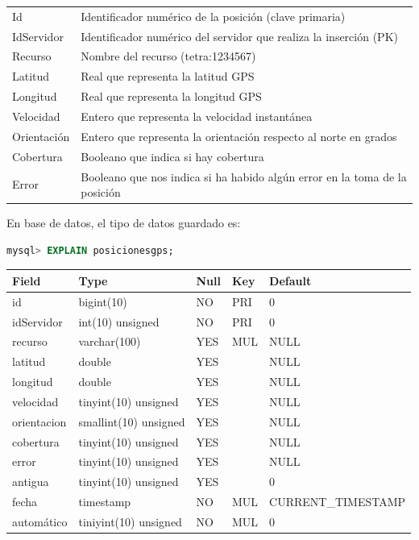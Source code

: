\documentclass[a4paper, 12pt]{article}
\begin{document}
\begin{center}
	\begin{tabular}{| l | l  |}
	\hline
	\rowcolor{LightCyan}
	\hline
  		\multicolumn{2}{|l|}{Par\'ametros} \\
	\hline
	Id & Identificador num\'erico de la posici\'on (clave primaria) \\
	IdServidor & Identificador num\'erico del servidor que realiza la inserci\'on (PK) \\
	Recurso & Nombre del recurso (tetra:1234567) \\
	Latitud & Real que representa la latitud GPS \\
	Longitud & Real que representa la longitud GPS \\
		Velocidad & Entero que representa la velocidad instant\'anea \\
	Orientaci\'on & Entero que representa la orientaci\'on respecto al norte en grados \\
	Cobertura & Booleano que indica si hay cobertura \\
	Error & Booleano que nos indica si ha habido alg\'un error en la toma de la posici\'on \\
	\hline
	\end{tabular}

\end{center}

\smallskip

En base de datos, el tipo de datos guardado es:\\

\begin{lstlisting}[language=sql, basicstyle=\small, columns=fullflexible, frame=tbrl]
mysql> EXPLAIN posicionesgps;
\end{lstlisting}


\begin{center}
	
	\begin{tabular}{|l|l|l|l|l|}
	\hline
	\rowcolor{LightCyan}
	\hline
	Field & Type & Null & Key & Default \\
	\hline
	id & bigint(10) & NO &  PRI & 0  \\
	idServidor & int(10) unsigned & NO & PRI & 0 \\
	recurso & varchar(100) & YES & MUL & NULL  \\
	latitud & double & YES & & NULL  \\
	longitud & double & YES & & NULL  \\
	velocidad & tinyint(10) unsigned & YES & & NULL  \\
	orientacion & smallint(10) unsigned & YES  & & NULL  \\
	cobertura & tinyint(10) unsigned & YES  & & NULL \\
	error & tinyint(10) unsigned  & YES & & NULL  \\
	antigua & tinyint(10) unsigned & YES  & & 0  \\
	fecha & timestamp & NO & MUL & CURRENT\_TIMESTAMP \\
	autom\'atico & tiniyint(10) unsigned & NO & MUL & 0  \\
	\hline
	\end{tabular}
\end{center}
\end{document}
